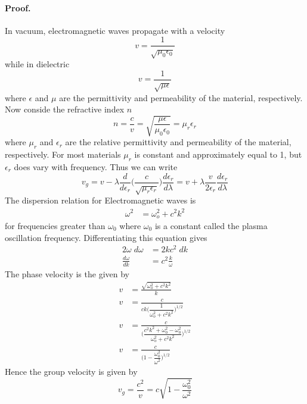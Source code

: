 \documentclass[../../../main.tex]{subfiles}
\begin{document}
\paragraph{Proof.} In vacuum, electromagnetic waves propagate with a velocity
\begin{equation*}
    v=\frac{1}{\sqrt{\mu_0\epsilon_0}}
\end{equation*}
while in dielectric 
\begin{equation*}
    v=\frac{1}{\sqrt{\mu\epsilon}}
\end{equation*}
where $\epsilon$ and $\mu$ are the permittivity and permeability of the material, respectively. Now conside the refractive index $n$
\begin{equation*}
    n=\frac{c}{v}=\sqrt{\frac{\mu\epsilon}{\mu_0\epsilon_0}}=\mu_r\epsilon_r
\end{equation*}
where $\mu_r$ and $\epsilon_r$ are the relative permittivity and permeability of the material, respectively. For most materials $\mu_r$ is constant and approximately equal to 1, but $\epsilon
_r$ does vary with frequency. Thus we can write 
\begin{equation*}
    v_g=v-\lambda\frac{d}{d\epsilon_r}\biggl(\frac{c}{\sqrt{\mu_r\epsilon_r}}\biggr) \frac{d\epsilon_r}{d\lambda}=v+\lambda\frac{v}{2\epsilon_r}\frac{d\epsilon_r}{d\lambda}
\end{equation*}The dispersion relation for Electromagnetic waves is 
\begin{align*}
    \omega^2&=\omega_o^2+c^2k^2
\end{align*}
for frequencies greater than $\omega_0$ where $\omega_0$ is a constant called the plasma oscillation frequency. Differentiating this equation gives
\begin{align*}
    2\omega\;d\omega&=2kc^2\;dk\\
    \frac{d\omega}{dk}&=c^2\frac{k}{\omega}
\end{align*}
The phase velocity is the given by 
\begin{align*}
    v&=\frac{\sqrt{\omega_o^2+c^2k^2}}{k}\\
    v&=\frac{c}{ck\biggl(\dfrac{1}{\omega_o^2+c^2k^2}\biggr)^{1/2}}\\
    v&=\frac{c}{\biggl(\dfrac{c^2k^2+\omega_0^2-\omega_0^2}{\omega_o^2+c^2k^2}\biggr)^{1/2}}\\
    v&=\frac{c}{\biggl(1-\dfrac{\omega_0^2}{\omega^2}\biggr)^{1/2}}
\end{align*}
Hence the group velocity is given by 
\begin{equation*}
    v_g=\frac{c^2}{v}=c\sqrt{1-\dfrac{\omega_0^2}{\omega^2}}
\end{equation*}
\end{document}

